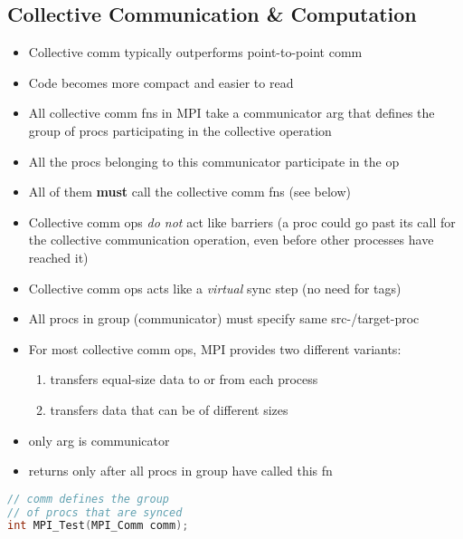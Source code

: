\subsection*{Collective Communication \& Computation}
\begin{itemize}
\item Collective comm typically outperforms point-to-point comm
\item Code becomes more compact and easier to read
\item All collective comm fns in MPI take a communicator arg that defines the group of procs participating in the collective operation
\item All the procs belonging to this communicator participate in the op
\item All of them \textbf{must} call the collective comm fns (see below)
\item Collective comm ops \emph{do not} act like barriers (a proc could go past its call for the collective communication operation, even before other processes have reached it)
\item Collective comm ops acts like a \emph{virtual} sync step (no need for tags)
\item All procs in group (communicator) must specify same src-/target-proc
\item For most collective comm ops, MPI provides two different variants:
  \begin{enumerate}
  \item transfers equal-size data to or from each process
  \item transfers data that can be of different sizes
  \end{enumerate}
\end{itemize}

\begin{minipage}{0.5\linewidth}
  \flushleft
  \begin{itemize}
  \item only arg is communicator
  \item returns only after all procs in group have called this fn
  \end{itemize}
\end{minipage}
\begin{minipage}{0.5\linewidth}
\begin{lstlisting}[language=c,xleftmargin=1pt]
// comm defines the group
// of procs that are synced
int MPI_Test(MPI_Comm comm);
\end{lstlisting}
\end{minipage}


